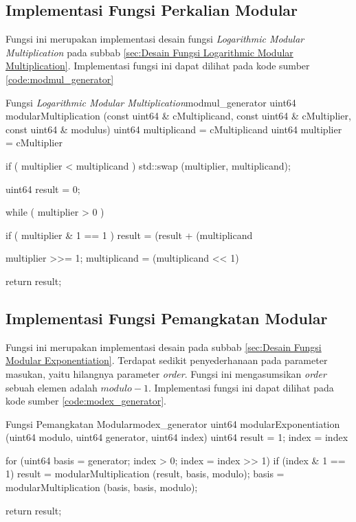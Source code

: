\subsection{Implementasi Fungsi Perkalian Modular}

Fungsi ini merupakan implementasi desain fungsi \textit{Logarithmic Modular Multiplication} pada subbab \ref{sec:Desain Fungsi Logarithmic Modular Multiplication}. Implementasi fungsi ini dapat dilihat pada kode sumber \ref{code:modmul_generator}
\begin{code}[firstnumber=0]{Fungsi \textit{Logarithmic Modular Multiplication}}{modmul_generator}
uint64 modularMultiplication (const uint64 & cMultiplicand, const uint64 & cMultiplier, const uint64 & modulus)
uint64 multiplicand = cMultiplicand %
uint64 multiplier = cMultiplier %

if ( multiplier < multiplicand )
std::swap (multiplier, multiplicand);

uint64 result = 0;

while ( multiplier > 0 )
{
	if ( multiplier & 1 == 1 )
	{
		result = (result + (multiplicand %
	}
	
	multiplier >>= 1;
	multiplicand = (multiplicand << 1) %
}

return result;
\end{code}

\subsection{Implementasi Fungsi Pemangkatan Modular}

Fungsi ini merupakan implementasi desain pada subbab \ref{sec:Desain Fungsi Modular Exponentiation}. Terdapat sedikit penyederhanaan pada parameter masukan, yaitu hilangnya parameter \textit{order}. Fungsi ini mengasumsikan \textit{order} sebuah elemen adalah $ modulo - 1 $. Implementasi fungsi ini dapat dilihat pada kode sumber \ref{code:modex_generator}.

\pagebreak

\begin{code}[firstnumber=0]{Fungsi Pemangkatan Modular}{modex_generator}
uint64 modularExponentiation (uint64 modulo, uint64 generator, uint64 index)
uint64 result = 1;
index = index %

for (uint64 basis = generator; index > 0; index = index >> 1)
{
	if (index & 1 == 1)
	result = modularMultiplication (result, basis, modulo);
	basis = modularMultiplication (basis, basis, modulo);
}

return result;
\end{code}

